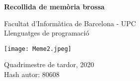 \begin{titlepage}
    \begin{center}
        \vspace*{0.5cm}
            
        \huge
        \textbf{Recollida de memòria brossa}
            
        \vspace{0.5cm}
        \LARGE
        Facultat d'Informàtica de Barcelona - UPC\\
        Llenguatges de programació    
        \vspace{0.5cm}
        
        \texttt{[image: Meme2.jpeg]}
        \large
        \begin{flushright}
        Quadrimestre de tardor, 2020
        \\Hash autor: 80608    
        \end{flushright}

    \end{center}
\end{titlepage}